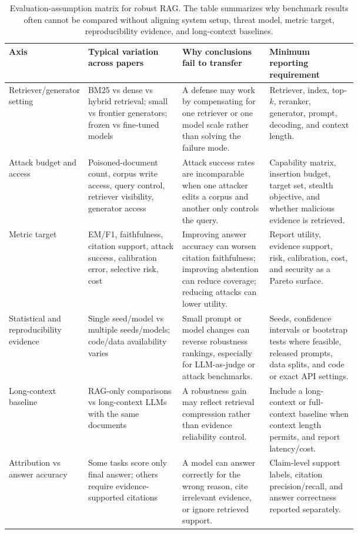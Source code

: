 \documentclass[11pt]{article}
\begin{document}
\begin{table}[t]
\centering
\scriptsize
\renewcommand{\arraystretch}{0.92}
\begin{tabularx}{\linewidth}{>{\raggedright\arraybackslash}p{0.17\linewidth}>{\raggedright\arraybackslash}p{0.27\linewidth}>{\raggedright\arraybackslash}p{0.25\linewidth}X}
\toprule
\textbf{Axis} & \textbf{Typical variation across papers} & \textbf{Why conclusions fail to transfer} & \textbf{Minimum reporting requirement} \\
\midrule
Retriever/generator setting & BM25 vs dense vs hybrid retrieval; small vs frontier generators; frozen vs fine-tuned models & A defense may work by compensating for one retriever or one model scale rather than solving the failure mode. & Retriever, index, top-$k$, reranker, generator, prompt, decoding, and context length. \\
Attack budget and access & Poisoned-document count, corpus write access, query control, retriever visibility, generator access & Attack success rates are incomparable when one attacker edits a corpus and another only controls the query. & Capability matrix, insertion budget, target set, stealth objective, and whether malicious evidence is retrieved. \\
Metric target & EM/F1, faithfulness, citation support, attack success, calibration error, selective risk, cost & Improving answer accuracy can worsen citation faithfulness; improving abstention can reduce coverage; reducing attacks can lower utility. & Report utility, evidence support, risk, calibration, cost, and security as a Pareto surface. \\
Statistical and reproducibility evidence & Single seed/model vs multiple seeds/models; code/data availability varies & Small prompt or model changes can reverse robustness rankings, especially for LLM-as-judge or attack benchmarks. & Seeds, confidence intervals or bootstrap tests where feasible, released prompts, data splits, and code or exact API settings. \\
Long-context baseline & RAG-only comparisons vs long-context LLMs with the same documents & A robustness gain may reflect retrieval compression rather than evidence reliability control. & Include a long-context or full-context baseline when context length permits, and report latency/cost. \\
Attribution vs answer accuracy & Some tasks score only final answer; others require evidence-supported citations & A model can answer correctly for the wrong reason, cite irrelevant evidence, or ignore retrieved support. & Claim-level support labels, citation precision/recall, and answer correctness reported separately. \\
\bottomrule
\end{tabularx}
\caption{Evaluation-assumption matrix for robust RAG. The table summarizes why benchmark results often cannot be compared without aligning system setup, threat model, metric target, reproducibility evidence, and long-context baselines.}
\label{tab:evaluation-assumption-matrix}
\end{table}
\end{document}
